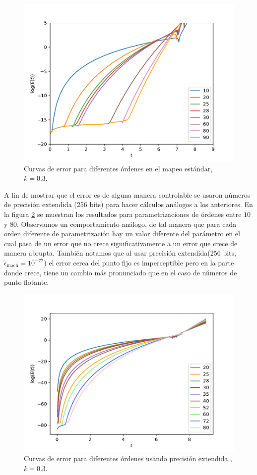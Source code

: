 \begin{figure}[H]
\centering
\includegraphics[scale=0.7]{errorf64}
\caption{Curvas de error para diferentes órdenes en el mapeo estándar, $k=0.3$. }
\label{erroresf64}
\end{figure}
A fin de mostrar que el error es de alguna manera controlable se usaron números de precisión extendida (256 bits) para hacer cálculos análogos a los anteriores. En la figura \ref{erroresBig} se muestran los resultados para parametrizaciones de órdenes entre $10$ y $80$. Observamos un comportamiento análogo, de tal manera que para cada orden diferente de parametrización hay un valor diferente del parámetro en el cual pasa de un error que no crece significativamente a un error que crece de manera abrupta. También notamos que al usar precisión extendida(256 bits, $\epsilon_{\mathrm{mach}}=10^{-77}$) el error cerca del punto fijo es imperceptible pero en la parte donde crece, tiene un cambio más pronunciado que en el caso de números de punto flotante. 

\begin{figure}[H]
\centering
\includegraphics[scale=0.7]{errorbf}
\caption{Curvas de error para diferentes órdenes usando precisión extendida ,$k=0.3$. }
\label{erroresBig}
\end{figure}

